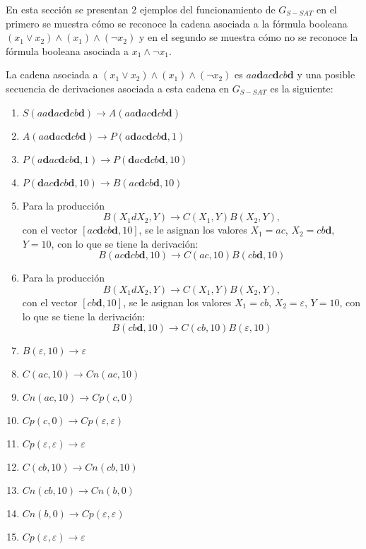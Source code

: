\documentclass[12pt]{article}
\begin{document}
En esta sección se presentan 2 ejemplos del funcionamiento de $G_{S-SAT}$ en el primero se muestra cómo se reconoce la cadena asociada a la fórmula booleana $(x_1 \vee x_2) \wedge (x_1) \wedge (\neg x_2)$ y en el segundo se muestra cómo no se reconoce la fórmula booleana asociada a $x_1 \wedge \neg x_1$.

La cadena asociada a $(x_1 \vee x_2) \wedge (x_1) \wedge (\neg x_2)$ es $aa\mathbf{d}ac\mathbf{d}cb\mathbf{d}$ y una posible secuencia de derivaciones
asociada a esta cadena en $G_{S-SAT}$ es la siguiente:

\begin{enumerate}
    \item $S(aa\mathbf{d}ac\mathbf{d}cb\mathbf{d})\to A(aa\mathbf{d}ac\mathbf{d}cb\mathbf{d})$
    \item $A(aa\mathbf{d}ac\mathbf{d}cb\mathbf{d})\to P(a\mathbf{d}ac\mathbf{d}cb\mathbf{d},1)$
    \item $P(a\mathbf{d}ac\mathbf{d}cb\mathbf{d},1)\to P(\mathbf{d}ac\mathbf{d}cb\mathbf{d},10)$
    \item $P(\mathbf{d}ac\mathbf{d}cb\mathbf{d},10)\to B(ac\mathbf{d}cb\mathbf{d}, 10)$
    \item Para la producción $$B(X_1dX_2,Y)\to C(X_1,Y) B(X_2,Y),$$ con el vector $[ac\mathbf{d}cb\mathbf{d}, 10]$,
          se le asignan los valores $X_1=ac$, $X_2=cb\mathbf{d}$, $Y=10$, con lo que se tiene la derivación:
          $$B(ac\mathbf{d}cb\mathbf{d}, 10)\to C(ac,10) B(cb\mathbf{d},10)$$
    \item Para la producción $$B(X_1dX_2,Y)\to C(X_1,Y) B(X_2,Y),$$ con el vector $[cb\mathbf{d},10]$,
          se le asignan los valores $X_1=cb$, $X_2=\varepsilon$, $Y=10$, con lo que se tiene la derivación:
          $$B(cb\mathbf{d},10)\to C(cb,10) B(\varepsilon,10)$$
    \item $B(\varepsilon,10)\to \varepsilon$
    \item $C(ac,10)\to Cn(ac,10)$
    \item $Cn(ac,10)\to Cp(c,0)$
    \item $Cp(c,0)\to Cp(\varepsilon,\varepsilon)$
    \item $Cp(\varepsilon, \varepsilon) \to \varepsilon$
    \item $C(cb,10)\to Cn(cb,10)$
    \item $Cn(cb,10)\to Cn(b,0)$
    \item $Cn(b,0)\to Cp(\varepsilon,\varepsilon)$
    \item $Cp(\varepsilon, \varepsilon) \to \varepsilon$
\end{enumerate}
\end{document}
